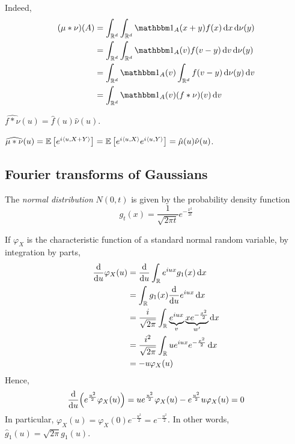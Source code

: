 Indeed,
\begin{align*}
	(\mu \ast \nu)(A) &= \int_{\mathbb R^d} \int_{\mathbb R^d} \mathbbm 1_A(x+y) f(x) \dd{x} \dd{\nu(y)} \\
	&= \int_{\mathbb R^d} \int_{\mathbb R^d} \mathbbm 1_A(v) f(v-y) \dd{v} \dd{\nu(y)} \\
	&= \int_{\mathbb R^d} \mathbbm 1_A(v) \int_{\mathbb R^d}f(v-y) \dd{\nu(y)} \dd{v} \\
	&= \int_{\mathbb R^d} \mathbbm 1_A(v) (f \ast \nu)(v) \dd{v}
\end{align*}
\begin{proposition}
	\( \widehat{f \ast \nu}(u) = \hat f(u) \hat \nu(u) \).
\end{proposition}
\begin{proposition}
	\( \widehat{\mu \ast \nu}(u) = \mathbb{E}\left[{e^{i\left\langle{u,X+Y}\right\rangle}}\right] = \mathbb{E}\left[{e^{i\left\langle{u,X}\right\rangle}e^{i\left\langle{u,Y}\right\rangle}}\right] = \hat \mu(u) \hat \nu(u) \).
\end{proposition}

\subsection{Fourier transforms of Gaussians}
\begin{definition}
	The \emph{normal distribution} \( N(0,t) \) is given by the probability density function
	\[ g_t(x) = \frac{1}{\sqrt{2\pi t}} e^{-\frac{x^2}{2t}} \]
\end{definition}
If \( \varphi_X \) is the characteristic function of a standard normal random variable, by integration by parts,
\begin{align*}
	\dv{u} \varphi_X(u) &= \dv{u} \int_{\mathbb R} e^{iux} g_1(x) \dd{x} \\
	&= \int_{\mathbb R} g_1(x) \dv{u} e^{iux} \dd{x} \\
	&= \frac{i}{\sqrt{2\pi}} \int_{\mathbb R} \underbrace{e^{iux}}_{v} \underbrace{x e^{-\frac{x^2}{2}}}_{w'} \dd{x} \\
	&= \frac{i^2}{\sqrt{2\pi}} \int_{\mathbb R} u e^{iux} e^{-\frac{x^2}{2}} \dd{x} \\
	&= -u \varphi_X(u)
\end{align*}
Hence,
\[ \dv{u}\qty(e^{\frac{u^2}{2}} \varphi_X(u)) = ue^{\frac{u^2}{2}} \varphi_X(u) - e^{\frac{u^2}{2}} u \varphi_X(u) = 0 \]
In particular, \( \varphi_X(u) = \varphi_X(0) e^{-\frac{u^2}{2}} = e^{-\frac{u^2}{2}} \).
In other words, \( \hat g_1(u) = \sqrt{2\pi} g_1(u) \).

